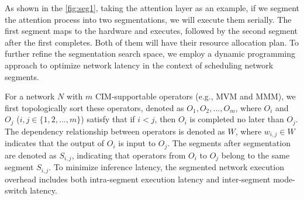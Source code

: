 As shown in the \fig \ref{fig:seg1}, taking the attention layer as an example, if we segment the attention process into two segmentations, we will execute them serially.
The first segment maps to the hardware and executes, followed by the second segment after the first completes.
Both of them will have their resource allocation plan.
To further refine the segmentation search space, we employ a dynamic programming approach to optimize network latency in the context of scheduling network segments.

For a network $N$ with $m$ CIM-supportable operators (e.g., MVM and MMM), we first topologically sort these operators, denoted as $O_1, O_2, ..., O_m$, where $O_i$ and $O_j$ ($i,j \in \{1,2,...,m\}$) satisfy that if $i < j$, then $O_i$ is completed no later than $O_j$. The dependency relationship between operators is denoted as $W$, where $w_{i,j } \in W$ indicates that the output of $O_i$ is input to $O_j$. 
The segments after segmentation are denoted as $S_{i,j}$, indicating that operators from $O_i$ to $O_j$ belong to the same segment $S_{i,j}$. 
To minimize inference latency, the segmented network execution overhead includes both intra-segment execution latency and inter-segment mode-switch latency.

